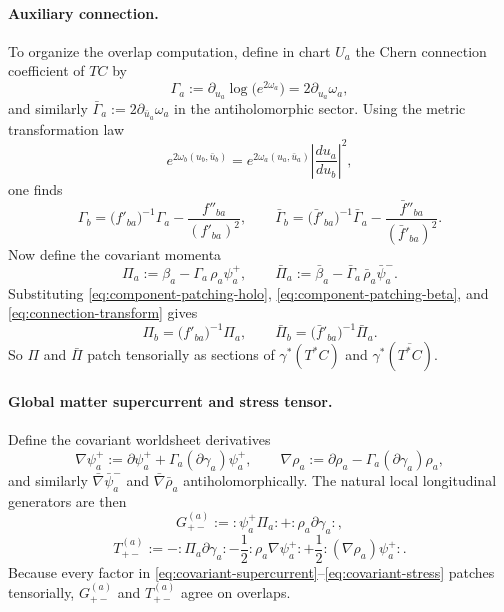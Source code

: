 \documentclass[11pt]{article}
\begin{document}
\paragraph{Auxiliary connection.}
To organize the overlap computation, define in chart $U_a$ the Chern connection coefficient of $TC$ by
\begin{equation}\label{eq:connection-coefficient}
\Gamma_a:=\partial_{u_a}\log\!\bigl(e^{2\omega_a}\bigr)=2\partial_{u_a}\omega_a,
\end{equation}
and similarly $\bar\Gamma_a:=2\partial_{\bar u_a}\omega_a$ in the antiholomorphic sector. Using the metric transformation law
\begin{equation}\label{eq:metric-transform}
e^{2\omega_b(u_b,\bar u_b)}
=
e^{2\omega_a(u_a,\bar u_a)}
\left|\frac{du_a}{du_b}\right|^2,
\end{equation}
one finds
\begin{equation}\label{eq:connection-transform}
\Gamma_b
=
\bigl(f'_{ba}\bigr)^{-1}\Gamma_a
-\frac{f''_{ba}}{(f'_{ba})^2},
\qquad
\bar\Gamma_b
=
\bigl(\bar f'_{ba}\bigr)^{-1}\bar\Gamma_a
-\frac{\bar f''_{ba}}{(\bar f'_{ba})^2}.
\end{equation}
Now define the covariant momenta
\begin{equation}\label{eq:covariant-momenta}
\Pi_a:=\beta_a-\Gamma_a\,\rho_a\psi_a^+,
\qquad
\bar\Pi_a:=\bar\beta_a-\bar\Gamma_a\,\bar\rho_a\bar\psi_a^-.
\end{equation}
Substituting \eqref{eq:component-patching-holo}, \eqref{eq:component-patching-beta}, and \eqref{eq:connection-transform} gives
\begin{equation}\label{eq:covariant-momenta-patch}
\Pi_b=\bigl(f'_{ba}\bigr)^{-1}\Pi_a,
\qquad
\bar\Pi_b=\bigl(\bar f'_{ba}\bigr)^{-1}\bar\Pi_a.
\end{equation}
So $\Pi$ and $\bar\Pi$ patch tensorially as sections of $\gamma^*(T^*C)$ and $\gamma^*(\overline{T^*C})$.

\paragraph{Global matter supercurrent and stress tensor.}
Define the covariant worldsheet derivatives
\begin{equation}\label{eq:covariant-derivatives}
\nabla\psi_a^+:=\partial\psi_a^+ + \Gamma_a (\partial\gamma_a)\psi_a^+,
\qquad
\nabla\rho_a:=\partial\rho_a - \Gamma_a (\partial\gamma_a)\rho_a,
\end{equation}
and similarly $\bar\nabla\bar\psi_a^-$ and $\bar\nabla\bar\rho_a$ antiholomorphically. The natural local longitudinal generators are then
\begin{equation}\label{eq:covariant-supercurrent}
G_{+-}^{(a)}:=:\!\psi_a^+\Pi_a\!:+:\!\rho_a\partial\gamma_a\!:,
\end{equation}
\begin{equation}\label{eq:covariant-stress}
T_{+-}^{(a)}
:=
-:\!\Pi_a\partial\gamma_a\!:
-\frac12:\!\rho_a\nabla\psi_a^+\!:
+\frac12:\!(\nabla\rho_a)\psi_a^+\!:.
\end{equation}
Because every factor in \eqref{eq:covariant-supercurrent}--\eqref{eq:covariant-stress} patches tensorially, $G_{+-}^{(a)}$ and $T_{+-}^{(a)}$ agree on overlaps.
\end{document}

